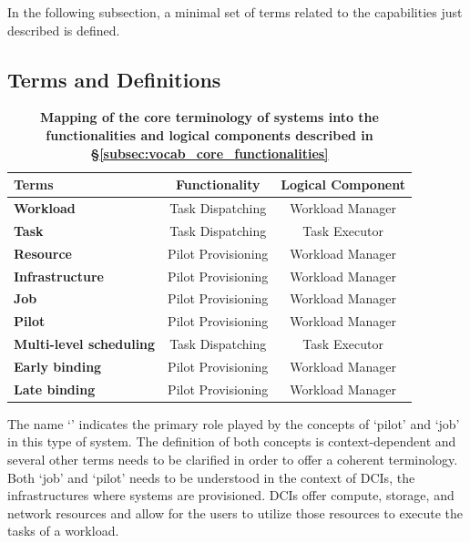 \documentclass{sig-alternate}
\begin{document}
In the following subsection, a minimal set of terms related to the
capabilities just described is defined.

\subsection{Terms and Definitions}
\label{subsec:vocab_terms_and_definitions}


\begin{table}[t]
 \up
 \centering
 \begin{tabular}{|l|c|c|}
  \hline
    \textbf{Terms} & \textbf{Functionality} & \textbf{Logical Component} \\
  \hline
    \textbf{Workload} & Task Dispatching & Workload Manager \\
  \hline
    \textbf{Task} & Task Dispatching & Task Executor \\
  \hline
    \textbf{Resource} & Pilot Provisioning & Workload Manager \\
  \hline
    \textbf{Infrastructure} & Pilot Provisioning & Workload Manager \\
  \hline
    \textbf{Job} & Pilot Provisioning & Workload Manager \\
  \hline
    \textbf{Pilot} & Pilot Provisioning & Workload Manager \\
  \hline
    \textbf{Multi-level scheduling} & Task Dispatching & Task Executor \\
  \hline
    \textbf{Early binding} & Pilot Provisioning & Workload Manager \\
  \hline
    \textbf{Late binding} & Pilot Provisioning & Workload Manager \\
  \hline
 \end{tabular}
 \caption{\textbf{Mapping of the core terminology of \pilot systems into 
  the functionalities and logical components described in 
  \S\ref{subsec:vocab_core_functionalities}}\up}
 \label{table:terminology}
\end{table}

The name `\pilotjob' indicates the primary role played by the concepts of
`pilot' and `job' in this type of system. The definition of both concepts is
context-dependent and several other terms needs to be clarified in order to
offer a coherent terminology. Both `job' and `pilot' needs to be understood in
the context of DCIs, the infrastructures where \pilotjobs systems are
provisioned. DCIs offer compute, storage, and network resources and
\pilotjobs allow for the users to utilize those resources to execute the tasks
of a workload.
\end{document}
